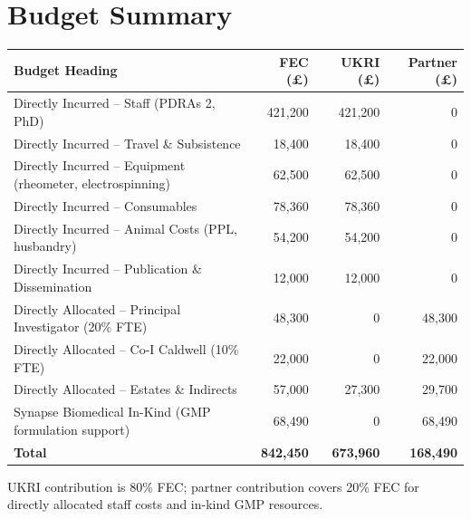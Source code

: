 \section{Budget Summary}

\vspace{4pt}

\begin{tabularx}{\linewidth}{@{} X r r r @{}}
\toprule
\rowcolor{ukriblue}
\color{white}\textbf{Budget Heading} &
\color{white}\textbf{FEC (\pounds)} &
\color{white}\textbf{UKRI (\pounds)} &
\color{white}\textbf{Partner (\pounds)} \\
\midrule
\rowcolor{ukrigray}
Directly Incurred -- Staff (PDRAs \texttimes{} 2, PhD) & 421,200 & 421,200 & 0 \\
\rowcolor{white}
Directly Incurred -- Travel \& Subsistence & 18,400 & 18,400 & 0 \\
\rowcolor{ukrigray}
Directly Incurred -- Equipment (rheometer, electrospinning) & 62,500 & 62,500 & 0 \\
\rowcolor{white}
Directly Incurred -- Consumables & 78,360 & 78,360 & 0 \\
\rowcolor{ukrigray}
Directly Incurred -- Animal Costs (PPL, husbandry) & 54,200 & 54,200 & 0 \\
\rowcolor{white}
Directly Incurred -- Publication \& Dissemination & 12,000 & 12,000 & 0 \\
\rowcolor{ukrigray}
Directly Allocated -- Principal Investigator (20\% FTE) & 48,300 & 0 & 48,300 \\
\rowcolor{white}
Directly Allocated -- Co-I Caldwell (10\% FTE) & 22,000 & 0 & 22,000 \\
\rowcolor{ukrigray}
Directly Allocated -- Estates \& Indirects & 57,000 & 27,300 & 29,700 \\
\rowcolor{white}
Synapse Biomedical In-Kind (GMP formulation support) & 68,490 & 0 & 68,490 \\
\midrule
\rowcolor{ukriblue!15}
\textbf{Total} & \textbf{842,450} & \textbf{673,960} & \textbf{168,490} \\
\bottomrule
\end{tabularx}

\vspace{6pt}
\noindent\textcolor{textgray}{\small UKRI contribution is 80\% FEC; partner contribution
covers 20\% FEC for directly allocated staff costs and in-kind GMP resources.}

